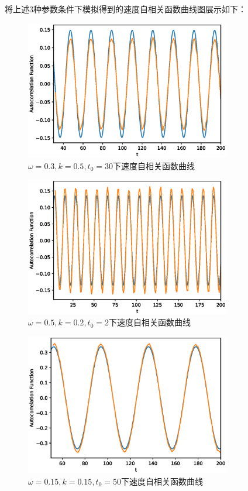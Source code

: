 \documentclass[12pt,a4paper,utf8]{ctexart}
\begin{document}
将上述3种参数条件下模拟得到的速度自相关函数曲线图展示如下：
\begin{figure}[htpb]
    \centering
    \includegraphics[width=0.8\textwidth]{fig1.eps}
    \caption{$\omega = 0.3,k = 0.5, t_0 = 30$下速度自相关函数曲线}
\end{figure}
\begin{figure}[htp]
    \centering
    \includegraphics[width=0.8\textwidth]{fig2.eps}
    \caption{$\omega = 0.5,k = 0.2, t_0 = 2$下速度自相关函数曲线}
\end{figure}
\begin{figure}[htp]
    \centering
    \includegraphics[width=0.8\textwidth]{fig3.eps}
    \caption{$\omega = 0.15,k = 0.15, t_0 = 50$下速度自相关函数曲线}
\end{figure}
\end{document}

